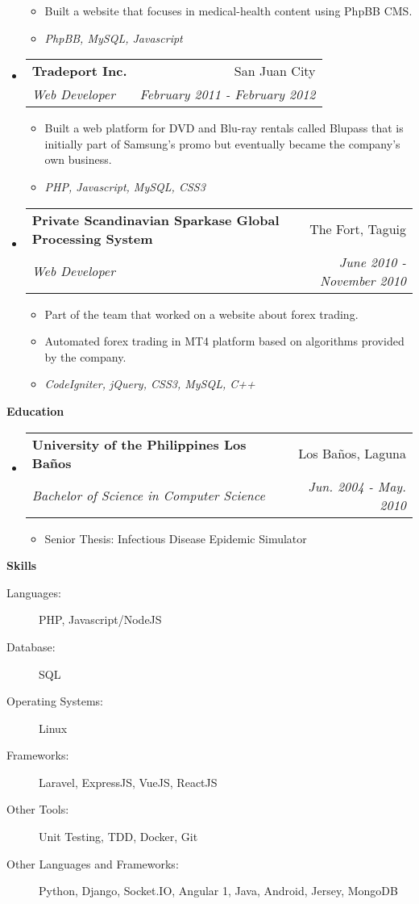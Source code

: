 \documentclass[letterpaper,9pt]{article}
\makeatletter
\newcommand{\resitem}[1]{\item #1 \vspace{-2pt}}
\newcommand{\resheading}[1]{{\large \colorbox{mygrey}{\begin{minipage}{\textwidth}{\textbf{#1 \vphantom{p\^{E}}}}\end{minipage}}}}
\newcommand{\ressubheading}[4]{
\begin{tabular*}{7.0in}{l@{\extracolsep{\fill}}r}
		\textbf{#1} & #2 \\
		\textit{#3} & \textit{#4} \\
\end{tabular*}\vspace{-6pt}}
\makeatother
\begin{document}
\begin{itemize}
	\begin{itemize}
		\resitem{Built a website that focuses in medical-health content using PhpBB CMS.}
        \resitem{\textit{PhpBB, MySQL, Javascript}}
	\end{itemize}
\item
	\ressubheading{Tradeport Inc.}{San Juan City}{Web Developer}{February 2011 - February 2012}
	\begin{itemize}
		\resitem{Built a web platform for DVD and Blu-ray rentals called Blupass that is initially part of Samsung’s promo but eventually became the company’s own business.}
        \resitem{\textit{PHP, Javascript, MySQL, CSS3}}
	\end{itemize}
\item
	\ressubheading{Private Scandinavian Sparkase Global Processing System}{The Fort, Taguig}{Web Developer}{June 2010 - November 2010}
	\begin{itemize}
		\resitem{Part of the team that worked on a website about forex trading.}
		\resitem{Automated forex trading in MT4 platform based on algorithms provided by the company.}
        \resitem{\textit{CodeIgniter, jQuery, CSS3, MySQL, C++}}
	\end{itemize}
\end{itemize}

\resheading{Education}
\begin{itemize}
\item
	\ressubheading{University of the Philippines Los Ba\~nos}{Los Ba\~nos, Laguna}{Bachelor of Science in Computer Science}{Jun. 2004 - May. 2010}
	\begin{itemize}
		\resitem{Senior Thesis: Infectious Disease Epidemic Simulator}
	\end{itemize}

\end{itemize}

\resheading{Skills}

\begin{description}
\item[Languages:]
PHP, Javascript/NodeJS
\item[Database:]
SQL
\item[Operating Systems:]
Linux 
\item[Frameworks:]
Laravel, ExpressJS, VueJS, ReactJS
\item[Other Tools:]
Unit Testing, TDD, Docker, Git
\item[Other Languages and Frameworks:]
Python, Django, Socket.IO, Angular 1, Java, Android, Jersey, MongoDB
\end{description}

\pagebreak
\end{document}
